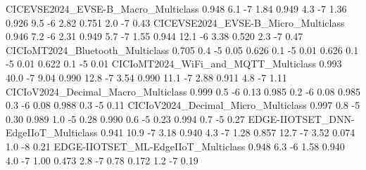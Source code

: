 CICEVSE2024_EVSE-B_Macro_Multiclass                                   0.948                6.1           -7            1.84      0.949                   4.3              -7               1.36      0.926                   9.5              -6               2.82       0.751                    2.0               -7                0.43
CICEVSE2024_EVSE-B_Micro_Multiclass                                   0.946                7.2           -6            2.31      0.949                   5.7              -7               1.55      0.944                  12.1              -6               3.38       0.520                    2.3               -7                0.47
CICIoMT2024_Bluetooth_Multiclass                                      0.705                0.4           -5            0.05      0.626                   0.1              -5               0.01      0.626                   0.1              -5               0.01       0.622                    0.1               -5                0.01
CICIoMT2024_WiFi_and_MQTT_Multiclass                                  0.993               40.0           -7            9.04      0.990                  12.8              -7               3.54      0.990                  11.1              -7               2.88       0.911                    4.8               -7                1.11
CICIoV2024_Decimal_Macro_Multiclass                                   0.999                0.5           -6            0.13      0.985                   0.2              -6               0.08      0.985                   0.3              -6               0.08       0.988                    0.3               -5                0.11
CICIoV2024_Decimal_Micro_Multiclass                                   0.997                0.8           -5            0.30      0.989                   1.0              -5               0.28      0.990                   0.6              -5               0.23       0.994                    0.7               -5                0.27
EDGE-IIOTSET_DNN-EdgeIIoT_Multiclass                                  0.941               10.9           -7            3.18      0.940                   4.3              -7               1.28      0.857                  12.7              -7               3.52       0.074                    1.0               -8                0.21
EDGE-IIOTSET_ML-EdgeIIoT_Multiclass                                   0.948                6.3           -6            1.58      0.940                   4.0              -7               1.00      0.473                   2.8              -7               0.78       0.172                    1.2               -7                0.19
